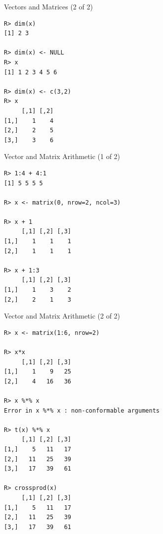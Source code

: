 \begin{frame}[fragile]
  \begin{exampleblock}{Vectors and Matrices (2 of 2)}\pause
  
\begin{lstlisting}[backgroundcolor=\color{white},basicstyle=\ttfamily\color{
dkgray}\scriptsize,keywordstyle=\color{black}, 
  commentstyle=\color{orange},stringstyle=\color{mauve}]
R> dim(x)
[1] 2 3

R> dim(x) <- NULL
R> x
[1] 1 2 3 4 5 6

R> dim(x) <- c(3,2)
R> x
     [,1] [,2]
[1,]    1    4
[2,]    2    5
[3,]    3    6
\end{lstlisting}
  \end{exampleblock}
\end{frame}


\begin{frame}[fragile]
  \begin{exampleblock}{Vector and Matrix Arithmetic (1 of 2)}\pause
  
\begin{lstlisting}[backgroundcolor=\color{white},basicstyle=\ttfamily\color{
dkgray}\scriptsize,keywordstyle=\color{black}, 
  commentstyle=\color{orange},stringstyle=\color{mauve}]
R> 1:4 + 4:1
[1] 5 5 5 5

R> x <- matrix(0, nrow=2, ncol=3)

R> x + 1
     [,1] [,2] [,3]
[1,]    1    1    1
[2,]    1    1    1

R> x + 1:3
     [,1] [,2] [,3]
[1,]    1    3    2
[2,]    2    1    3

\end{lstlisting} %
  \end{exampleblock}
\end{frame}



\begin{frame}
  \begin{exampleblock}{Vector and Matrix Arithmetic (2 of 2)}\pause
  
\begin{lstlisting}[backgroundcolor=\color{white},basicstyle=\ttfamily\color{
dkgray}\scriptsize,keywordstyle=\color{black}, 
  commentstyle=\color{orange},stringstyle=\color{mauve}]
R> x <- matrix(1:6, nrow=2)

R> x*x
     [,1] [,2] [,3]
[1,]    1    9   25
[2,]    4   16   36

R> x %*% x
Error in x %*% x : non-conformable arguments

R> t(x) %*% x
     [,1] [,2] [,3]
[1,]    5   11   17
[2,]   11   25   39
[3,]   17   39   61

R> crossprod(x)
     [,1] [,2] [,3]
[1,]    5   11   17
[2,]   11   25   39
[3,]   17   39   61
\end{lstlisting}
  \end{exampleblock}
\end{frame}

